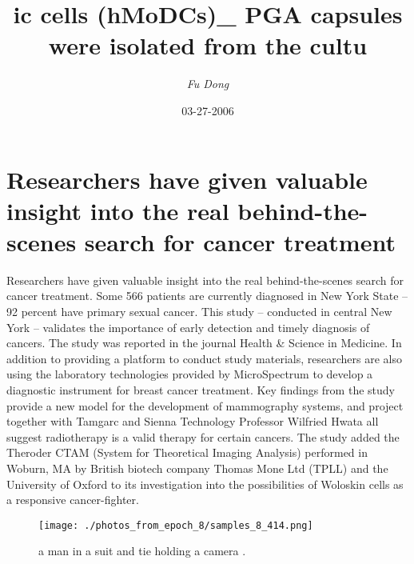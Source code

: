 \documentclass{article}%
\title{ic cells (hMoDCs)\_ PGA capsules were isolated from the cultu}%
\author{\textit{Fu Dong}}%
\date{03-27-2006}%
\begin{document}
%
\normalsize%
\maketitle%
\section{Researchers have given valuable insight into the real behind{-}the{-}scenes search for cancer treatment}%
\label{sec:Researchershavegivenvaluableinsightintotherealbehind{-}the{-}scenessearchforcancertreatment}%
Researchers have given valuable insight into the real behind{-}the{-}scenes search for cancer treatment.\newline%
Some 566 patients are currently diagnosed in New York State – 92 percent have primary sexual cancer. This study – conducted in central New York – validates the importance of early detection and timely diagnosis of cancers.\newline%
The study was reported in the journal Health \& Science in Medicine.\newline%
In addition to providing a platform to conduct study materials, researchers are also using the laboratory technologies provided by MicroSpectrum to develop a diagnostic instrument for breast cancer treatment.\newline%
Key findings from the study provide a new model for the development of mammography systems, and project together with Tamgarc and Sienna Technology Professor Wilfried Hwata all suggest radiotherapy is a valid therapy for certain cancers. The study added the Theroder CTAM (System for Theoretical Imaging Analysis) performed in Woburn, MA by British biotech company Thomas Mone Ltd (TPLL) and the University of Oxford to its investigation into the possibilities of Woloskin cells as a responsive cancer{-}fighter.\newline%

%


\begin{figure}[h!]%
\centering%
\texttt{[image: ./photos\_from\_epoch\_8/samples\_8\_414.png]}%
\caption{a man in a suit and tie holding a camera .}%
\end{figure}

%
\end{document}
